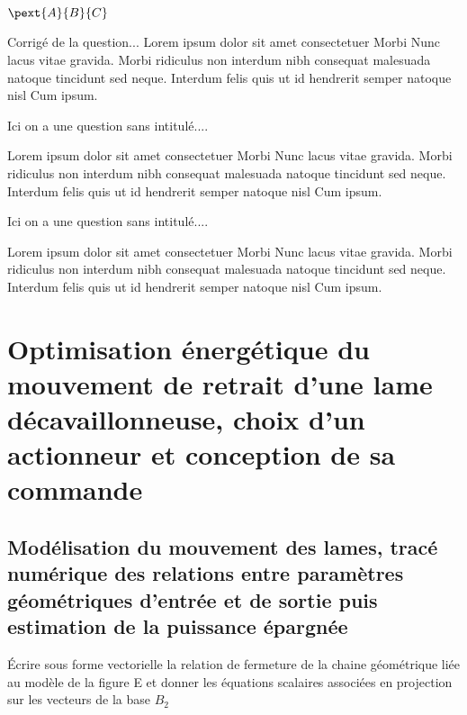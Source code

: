 \documentclass[11pt]{article}
\begin{document}
$\pext{A}{B}{C}$

\begin{UPSTIcorrige}
Corrigé de la question... Lorem ipsum dolor sit amet consectetuer Morbi Nunc lacus vitae gravida. Morbi ridiculus non interdum nibh consequat malesuada natoque tincidunt sed neque. Interdum felis quis ut id hendrerit semper natoque nisl Cum ipsum.
\end{UPSTIcorrige}

\UPSTIquestion

\begin{UPSTIcorrige}
Ici on a une question sans intitulé....

Lorem ipsum dolor sit amet consectetuer Morbi Nunc lacus vitae gravida. Morbi ridiculus non interdum nibh consequat malesuada natoque tincidunt sed neque. Interdum felis quis ut id hendrerit semper natoque nisl Cum ipsum. 
\end{UPSTIcorrige}

\UPSTIquestion

\begin{UPSTIcorrige}
Ici on a une question sans intitulé....

Lorem ipsum dolor sit amet consectetuer Morbi Nunc lacus vitae gravida. Morbi ridiculus non interdum nibh consequat malesuada natoque tincidunt sed neque. Interdum felis quis ut id hendrerit semper natoque nisl Cum ipsum. 
\end{UPSTIcorrige}


\section{Optimisation énergétique du mouvement de retrait d'une lame décavaillonneuse, choix d'un actionneur et conception de sa commande}

\subsection{Modélisation du mouvement des lames, tracé numérique des relations entre paramètres géométriques d'entrée et de sortie puis estimation de la puissance épargnée}

\UPSTIquestion Écrire sous forme vectorielle la relation de fermeture de la chaine géométrique liée au modèle de la figure E et donner les équations scalaires associées en projection sur les vecteurs de la base $B_2$
\end{document}
